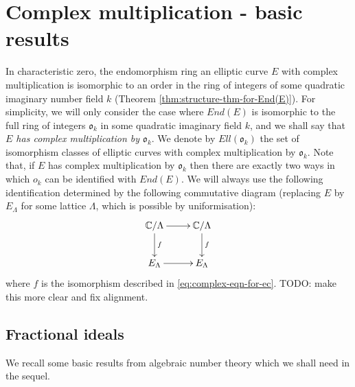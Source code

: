 \newpage
\section{Complex multiplication - basic results}
\label{sec:compl-mult-basic}

In characteristic zero, the endomorphism ring an elliptic curve $E$ with complex
multiplication is isomorphic to an order in the ring of integers of some quadratic imaginary number field
$k$ (Theorem \ref{thm:structure-thm-for-End(E)}).  For simplicity, we will only
consider the case where $End(E)$ is isomorphic to the full ring of integers
$\mathfrak{o}_{k}$ in some quadratic imaginary field $k$, and we shall say that \emph{$E$
has complex multiplication by $\mathfrak{o}_{k}$}.  We denote by
$Ell(\mathfrak{o}_{k})$ the set of isomorphism classes of elliptic curves with
complex multiplication by $\mathfrak{o}_{k}$.  Note that, if $E$ has complex
multiplication by $\mathfrak{o}_{k}$ then there are exactly two ways in which $o_{k}$
can be identified with $End(E)$.  We will always use the following identification
determined by the following commutative diagram (replacing $E$ by $E_{\Lambda}$ for
some lattice $\Lambda$, which is possible by uniformisation):
\begin{equation}
  \label{eq:o-identified-with-End(E)}
  \xymatrix{
    \mathbb{C} / \Lambda \ar[d]^{f} \ar[r] & \mathbb{C} / \Lambda \ar[d]^{f}\\
    E_{\Lambda} \ar[r]& E_{\Lambda}
  }  
\end{equation}
where $f$ is the isomorphism described in \eqref{eq:complex-eqn-for-ec}. TODO: make
this more clear and fix alignment.

\subsection{Fractional ideals}
\label{sec:fractional-ideals}

We recall some basic results from algebraic number theory which we shall need in the
sequel.

